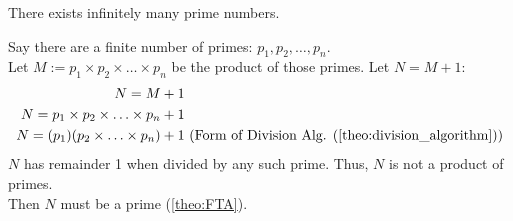 \newpage

\begin{theo}

    \label{theo:euclids_theorem}
    
        There exists infinitely many prime numbers.
\end{theo}

\begin{Proof}
    Say there are a finite number of primes: $p_1,p_2,\ldots,p_n$.\\
    Let $M:=p_1\times p_2\times\ldots\times p_n$ be the product of those primes. Let $N=M+1$:
    \begin{align*}
        N = M+1&\\
        N= p_1\times p_2\times\ldots\times p_n + 1&\\
        N= (p_1)(p_2\times\ldots\times p_n) + 1&\text{ (Form of Division Alg. (\ref{theo:division_algorithm}))}\\
    \end{align*}
    $N$ has remainder 1 when divided by any such prime. Thus, $N$ is not a product of primes.\\
    Then $N$ must be a prime (\ref{theo:FTA}).
\end{Proof}

